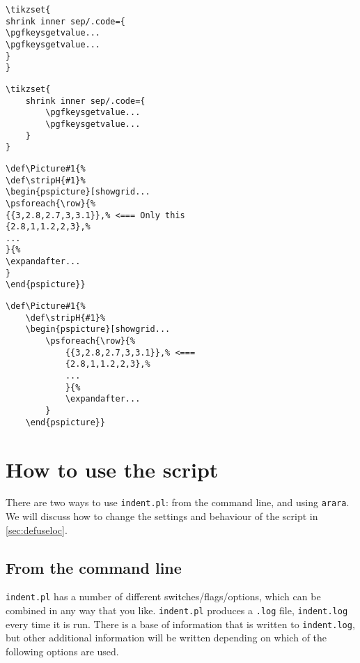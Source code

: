 \begin{adjustwidth}{-2cm}{2cm}
 	\begin{minipage}{.5\textwidth}
 		\begin{lstlisting}[style=demo,caption={\lstinline!tikzset! before}]
\tikzset{
shrink inner sep/.code={
\pgfkeysgetvalue...
\pgfkeysgetvalue...
}
}
 		\end{lstlisting}
 	\end{minipage}%
 	\begin{minipage}{.5\textwidth}
 		\begin{lstlisting}[style=demo,caption={\lstinline!tikzset! after}]
\tikzset{
	shrink inner sep/.code={
		\pgfkeysgetvalue...
		\pgfkeysgetvalue...
	}
}
 		\end{lstlisting}
 	\end{minipage}
 	\begin{minipage}{.5\textwidth}
 		\begin{lstlisting}[style=demo,caption={\lstinline!pstricks! before}]
\def\Picture#1{%
\def\stripH{#1}%
\begin{pspicture}[showgrid...
\psforeach{\row}{%
{{3,2.8,2.7,3,3.1}},% <=== Only this 
{2.8,1,1.2,2,3},%
...
}{%
\expandafter...
}
\end{pspicture}}
 		\end{lstlisting}
 	\end{minipage}%
 	\begin{minipage}{.5\textwidth}
 		\begin{lstlisting}[style=demo,caption={\lstinline!pstricks! after},label={lst:pstricksafter}]
\def\Picture#1{%
	\def\stripH{#1}%
	\begin{pspicture}[showgrid...
		\psforeach{\row}{%
			{{3,2.8,2.7,3,3.1}},% <=== 
			{2.8,1,1.2,2,3},%
            ...
			}{%
			\expandafter...
		}
	\end{pspicture}}
 		\end{lstlisting}
 	\end{minipage}
 \end{adjustwidth}
     
\section{How to use the script}
 There are two ways to use \lstinline!indent.pl!: from the command line, 
 and using \lstinline!arara!.  We will discuss how to change the settings and behaviour 
 of the script in \cref{sec:defuseloc}.
     
 \subsection{From the command line}\label{sec:commandline}
 	\lstinline!indent.pl! has a number of different switches/flags/options, which 
 	can be combined in any way that you like. \lstinline!indent.pl! 
 	produces a \lstinline!.log! file, \lstinline!indent.log! every time it
 	is run. There is a base of information that is written to \lstinline!indent.log!,
 	but other additional information will be written depending 
 	on which of the following options are used.
 	 	 	 	 	
